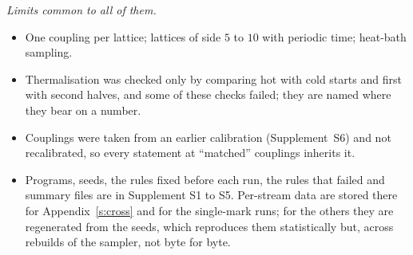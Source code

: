 \emph{Limits common to all of them.}
\begin{itemize}
\item One coupling per lattice; lattices of side $5$ to $10$ with periodic time; heat-bath sampling.
\item Thermalisation was checked only by comparing hot with cold starts and first with second halves, and
some of these checks failed; they are named where they bear on a number.
\item Couplings were taken from an earlier calibration (Supplement~S6) and not recalibrated, so every statement at
``matched'' couplings inherits it.
\item Programs, seeds, the rules fixed before each run, the rules that failed and summary files are
in Supplement S1 to S5. Per-stream data are stored there for Appendix~\ref{s:cross} and for the single-mark runs; for
the others they are regenerated from the seeds, which reproduces them statistically but, across rebuilds of
the sampler, not byte for byte.
\end{itemize}

